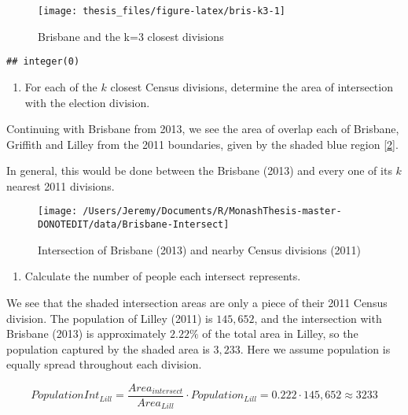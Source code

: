 \documentclass{monashthesis}
\theoremstyle{definition}
\theoremstyle{definition}
\theoremstyle{definition}
\theoremstyle{remark}
\begin{document}
\begin{figure}

{\centering \texttt{[image: thesis\_files/figure-latex/bris-k3-1]} 

}

\caption{Brisbane and the k=3 closest divisions}\label{fig:bris-k3}
\end{figure}

\begin{verbatim}
## integer(0)
\end{verbatim}

\begin{enumerate}
\def\labelenumi{\arabic{enumi}.}
\setcounter{enumi}{4}
\tightlist
\item
  For each of the \(k\) closest Census divisions, determine the area of
  intersection with the election division.
\end{enumerate}

Continuing with Brisbane from 2013, we see the area of overlap each of
Brisbane, Griffith and Lilley from the 2011 boundaries, given by the
shaded blue region {[}\ref{fig:bris-ints}{]}.

In general, this would be done between the Brisbane (2013) and every one
of its \(k\) nearest 2011 divisions.

\begin{figure}

\texttt{[image: /Users/Jeremy/Documents/R/MonashThesis-master-DONOTEDIT/data/Brisbane-Intersect]} \hfill{}

\caption{Intersection of Brisbane (2013) and nearby Census divisions (2011)}\label{fig:bris-ints}
\end{figure}

\begin{enumerate}
\def\labelenumi{\arabic{enumi}.}
\setcounter{enumi}{5}
\tightlist
\item
  Calculate the number of people each intersect represents.
\end{enumerate}

We see that the shaded intersection areas are only a piece of their 2011
Census division. The population of Lilley (2011) is \(145,652\), and the
intersection with Brisbane (2013) is approximately \(2.22\%\) of the
total area in Lilley, so the population captured by the shaded area is
\(3,233\). Here we assume population is equally spread throughout each
division.

\[PopulationInt_{Lill} = \frac{Area_{intersect}}{Area_{Lill}} \cdot Population_{Lill} = 0.222 \cdot 145,652 \approx 3233\]
\end{document}
